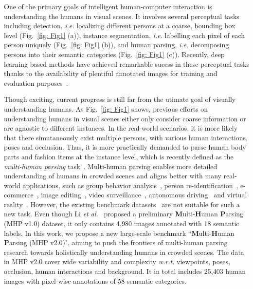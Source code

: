 \documentclass[10pt,twocolumn,letterpaper]{article}
\theoremstyle{definition}
\theoremstyle{remark}
\begin{document}
One of the primary goals of intelligent human-computer interaction is understanding the humans in visual scenes. It involves several perceptual tasks including detection, \emph{i.e.} localizing different persons at a coarse, bounding box level (Fig.~\ref{fig: Fig1} (a)), instance segmentation, \emph{i.e.} labelling each pixel of each person uniquely (Fig.~\ref{fig: Fig1} (b)), and human parsing, \emph{i.e.}  decomposing persons into their semantic categories (Fig.~\ref{fig: Fig1} (c)). Recently, deep learning based methods have achieved remarkable sucess in these perceptual tasks thanks to the availability of plentiful annotated images for training and evaluation purposes~\cite{dollar2012pedestrian, everingham2015pascal, lin2014microsoft, gong2017look}.

Though exciting, current progress is still far from the utimate goal of visually understanding humans. As Fig.~\ref{fig: Fig1} shows, previous efforts on understanding humans in visual scenes either only consider coarse information or are agnostic to different instances.  In the real-world scenarios, it is more likely that there simutaneously exist multiple persons, with various human interactions, poses and occlusion. Thus, it is more practically demanded to parse human body parts and fashion items at the instance level, which is recently defined as the \emph{multi-human parsing} task~\cite{li2017towards}. Multi-human parsing enables more detailed understanding of humans in crowded scenes and aligns better with many real-world applications, such as group behavior analysis~\cite{gan2016concepts}, person re-identification~\cite{zhao2013unsupervised}, e-commerce~\cite{turban2002electronic}, image editing~\cite{xu2016deep}, video surveillance~\cite{collins2000system}, autonomous driving~\cite{cordts2016cityscapes} and virtual reality~\cite{lin2016virtual}. However, the existing benchmark datasets~\cite{dollar2012pedestrian, everingham2015pascal, lin2014microsoft, gong2017look} are not suitable for such a new task. Even though Li \emph{et al.}~\cite{li2017towards} proposed a preliminary \textbf{M}ulti-\textbf{H}uman \textbf{P}arsing (MHP v1.0) dataset, it only contains 4{,}980 images annotated with 18 semantic labels. In this work, we propose a new large-scale benchmark ``\textbf{M}ulti-\textbf{H}uman \textbf{P}arsing (MHP v2.0)", aiming to push the frontiers of multi-human parsing research towards holistically understanding humans in crowded scenes. The data in MHP v2.0 cover wide variability and complexity \emph{w.r.t.} viewpoints, poses, occlusion, human interactions and background. It in total includes 25{,}403 human images with pixel-wise annotations of 58 semantic categories.
\end{document}
